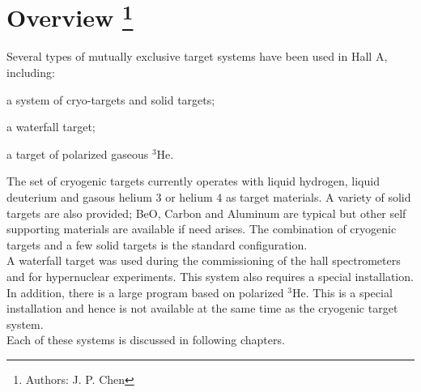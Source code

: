 \chapter[Overview]{ Overview
\label{sec:targets-overv}
\footnote{Authors: J. P. Chen }
}

Several types of mutually exclusive target systems have been used in Hall A, including:

\begin{list}{.~}{\setlength{\itemsep}{-0.15cm}}
  \item a system of cryo-targets and solid targets;
  \item a waterfall target;
  \item a target of polarized gaseous $^3$He.
\end{list}

The set of
cryogenic targets currently operates with liquid hydrogen, liquid
deuterium and gasous helium 3 or helium 4
as target materials.
A variety of solid targets are also provided; BeO, Carbon and
Aluminum are typical but other self supporting materials are available if need arises.
The combination of cryogenic targets and a few solid targets is
the standard configuration. \\

A waterfall target was used during the commissioning of
the hall spectrometers and for hypernuclear experiments. This system also 
requires a special installation. \\

In addition,
there is a large program based on polarized $^3$He. This
is a special installation and hence is not available at the same
time as the cryogenic target system.\\

Each of these systems is discussed in following chapters.
